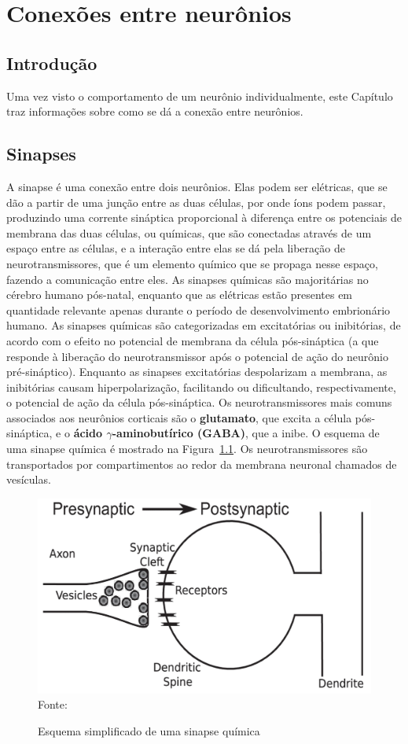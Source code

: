 \chapter{Conexões entre neurônios}\label{cap:conexoes}
\section{Introdução}\label{sec:conexoes_intro}
Uma vez visto o comportamento de um neurônio individualmente, este Capítulo traz informações sobre como se dá a conexão entre neurônios.
\section{Sinapses}\label{sec:sinapses}
A sinapse é uma conexão entre dois neurônios. Elas podem ser elétricas, que se dão a partir de uma junção entre as duas células, por onde íons podem passar, produzindo uma corrente sináptica proporcional à diferença entre os potenciais de membrana das duas células, ou químicas, que são conectadas através de um espaço entre as células, e a interação entre elas se dá pela liberação de neurotransmissores, que é um elemento químico que se propaga nesse espaço, fazendo a comunicação entre eles. As sinapses químicas são majoritárias no cérebro humano pós-natal, enquanto que as elétricas estão presentes em quantidade relevante apenas durante o período de desenvolvimento embrionário humano. As sinapses químicas são categorizadas em excitatórias ou inibitórias, de acordo com o efeito no potencial de membrana da célula pós-sináptica (a que responde à liberação do neurotransmissor após o potencial de ação do neurônio pré-sináptico). Enquanto as sinapses excitatórias despolarizam a membrana, as inibitórias causam hiperpolarização, facilitando ou dificultando, respectivamente, o potencial de ação da célula pós-sináptica. Os neurotransmissores mais comuns associados aos neurônios corticais são o \textbf{glutamato}, que excita a célula pós-sináptica, e o \textbf{ácido $\gamma$-aminobutírico (GABA)}, que a inibe. O esquema de uma sinapse química é mostrado na Figura~\ref{fig:sinapses}. Os neurotransmissores são transportados por compartimentos ao redor da membrana neuronal chamados de vesículas.
\begin{figure}[tb]
	\centering
	\caption{Esquema simplificado de uma sinapse química}
	\label{fig:sinapses}
	\includegraphics[width=0.7\linewidth]{figs/sinapses}\\
	\small{Fonte: \cite{miller_introductory_2018}}
\end{figure}

